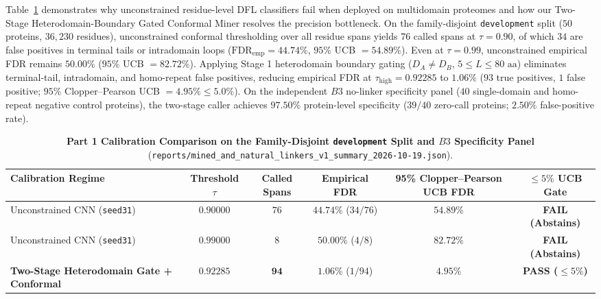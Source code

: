 \documentclass[11pt]{article}
\begin{document}
Table~\ref{tab:part1_calibration} demonstrates why unconstrained residue-level DFL classifiers fail when deployed on multidomain proteomes and how our Two-Stage Heterodomain-Boundary Gated Conformal Miner resolves the precision bottleneck. On the family-disjoint \texttt{development} split ($50$ proteins, $36{,}230$ residues), unconstrained conformal thresholding over all residue spans yields $76$ called spans at $\tau = 0.90$, of which $34$ are false positives in terminal tails or intradomain loops ($\text{FDR}_{\text{emp}} = 44.74\%$, $95\%$ UCB $= 54.89\%$). Even at $\tau = 0.99$, unconstrained empirical FDR remains $50.00\%$ ($95\%$ UCB $= 82.72\%$). Applying Stage 1 heterodomain boundary gating ($D_A \neq D_B$, $5 \le L \le 80\text{ aa}$) eliminates terminal-tail, intradomain, and homo-repeat false positives, reducing empirical FDR at $\tau_{\text{high}} = 0.92285$ to $\mathbf{1.06\%}$ ($93$ true positives, $1$ false positive; $95\%$ Clopper--Pearson UCB $= \mathbf{4.95\%} \le 5.0\%$). On the independent $B3$ no-linker specificity panel ($40$ single-domain and homo-repeat negative control proteins), the two-stage caller achieves $\mathbf{97.50\%}$ protein-level specificity ($39/40$ zero-call proteins; $2.50\%$ false-positive rate).

\begin{table}[h]
\centering
\caption{\textbf{Part 1 Calibration Comparison on the Family-Disjoint \texttt{development} Split and $B3$ Specificity Panel} (\texttt{reports/mined\_and\_natural\_linkers\_v1\_summary\_2026-10-19.json}).}
\label{tab:part1_calibration}
\small
\begin{tabular}{l c c c c c}
\toprule
\textbf{Calibration Regime} & \textbf{Threshold $\tau$} & \textbf{Called Spans} & \textbf{Empirical FDR} & \textbf{95\% Clopper--Pearson UCB FDR} & \textbf{$\le 5\%$ UCB Gate} \\
\midrule
Unconstrained CNN (\texttt{seed31}) & $0.90000$ & $76$ & $44.74\%$ ($34/76$) & $54.89\%$ & \textcolor{red!75!black}{\textbf{FAIL (Abstains)}} \\
Unconstrained CNN (\texttt{seed31}) & $0.99000$ & $8$  & $50.00\%$ ($4/8$)   & $82.72\%$ & \textcolor{red!75!black}{\textbf{FAIL (Abstains)}} \\
\midrule
\textbf{Two-Stage Heterodomain Gate + Conformal} & $\mathbf{0.92285}$ & $\mathbf{94}$ & $\mathbf{1.06\%}$ ($1/94$) & $\mathbf{4.95\%}$ & \textcolor{green!50!black}{\textbf{PASS ($\le 5\%$)}} \\
\bottomrule
\end{tabular}
\end{table}
\end{document}
